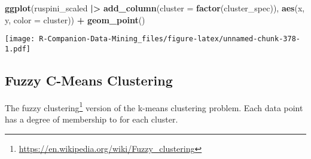 \documentclass[
  notitlepage]{book}
\newenvironment{Shaded}{\begin{snugshade}}{\end{snugshade}}
\newcommand{\DataTypeTok}[1]{\textcolor[rgb]{0.13,0.29,0.53}{#1}}
\newcommand{\ErrorTok}[1]{\textcolor[rgb]{0.64,0.00,0.00}{\textbf{#1}}}
\newcommand{\KeywordTok}[1]{\textcolor[rgb]{0.13,0.29,0.53}{\textbf{#1}}}
\newcommand{\NormalTok}[1]{#1}
\newcommand{\OperatorTok}[1]{\textcolor[rgb]{0.81,0.36,0.00}{\textbf{#1}}}
\newcommand{\StringTok}[1]{\textcolor[rgb]{0.31,0.60,0.02}{#1}}
\DeclareRobustCommand{\href}[2]{#2\footnote{\url{#1}}}
\begin{document}
\begin{Shaded}
\begin{Highlighting}[]
\KeywordTok{ggplot}\NormalTok{(ruspini\_scaled }\OperatorTok{|}\ErrorTok{\textgreater{}}\StringTok{ }
\StringTok{         }\KeywordTok{add\_column}\NormalTok{(}\DataTypeTok{cluster =} \KeywordTok{factor}\NormalTok{(cluster\_spec)),}
       \KeywordTok{aes}\NormalTok{(x, y, }\DataTypeTok{color =}\NormalTok{ cluster)) }\OperatorTok{+}\StringTok{ }
\StringTok{  }\KeywordTok{geom\_point}\NormalTok{()}
\end{Highlighting}
\end{Shaded}

\texttt{[image: R-Companion-Data-Mining\_files/figure-latex/unnamed-chunk-378-1.pdf]}

\hypertarget{fuzzy-c-means-clustering}{%
\subsection{Fuzzy C-Means Clustering}\label{fuzzy-c-means-clustering}}

The \href{https://en.wikipedia.org/wiki/Fuzzy_clustering}{fuzzy clustering}
version of the k-means clustering problem. Each data point has a degree
of membership to for each cluster.
\end{document}
